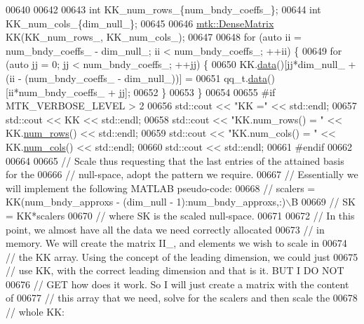 \begin{DoxyCode}
{{00640 
00642 
00643   \textcolor{keywordtype}{int} KK\_num\_rows\_\{num\_bndy\_coeffs\_\};
00644   \textcolor{keywordtype}{int} KK\_num\_cols\_\{dim\_null\_\};
00645 
00646   \hyperlink{classmtk_1_1DenseMatrix}{mtk::DenseMatrix} KK(KK\_num\_rows\_, KK\_num\_cols\_);
00647 
00648   \textcolor{keywordflow}{for} (\textcolor{keyword}{auto} ii = num\_bndy\_coeffs\_ - dim\_null\_; ii < num\_bndy\_coeffs\_; ++ii) \{
00649     \textcolor{keywordflow}{for} (\textcolor{keyword}{auto} jj = 0; jj < num\_bndy\_coeffs\_; ++jj) \{
00650       KK.\hyperlink{classmtk_1_1DenseMatrix_a0c33b8a9e01d157c61ddbdf807c25d84}{data}()[jj*dim\_null\_ + (ii - (num\_bndy\_coeffs\_ - dim\_null\_))] =
00651           qq\_t.\hyperlink{classmtk_1_1DenseMatrix_a0c33b8a9e01d157c61ddbdf807c25d84}{data}()[ii*num\_bndy\_coeffs\_ + jj];
00652     \}
00653   \}
00654 
00655 \textcolor{preprocessor}{  #if MTK\_VERBOSE\_LEVEL > 2}
00656   std::cout << \textcolor{stringliteral}{"KK ="} << std::endl;
00657   std::cout << KK << std::endl;
00658   std::cout << \textcolor{stringliteral}{"KK.num\_rows() = "} << KK.\hyperlink{classmtk_1_1DenseMatrix_a53f3afb3b6a8d21854458aaa9663cc74}{num\_rows}() << std::endl;
00659   std::cout << \textcolor{stringliteral}{"KK.num\_cols() = "} << KK.\hyperlink{classmtk_1_1DenseMatrix_a41747502d468c6728a4be31501b16e0e}{num\_cols}() << std::endl;
00660   std::cout << std::endl;
00661 \textcolor{preprocessor}{  #endif}
00662 
00664 
00665   \textcolor{comment}{// Scale thus requesting that the last entries of the attained basis for the}
00666   \textcolor{comment}{// null-space, adopt the pattern we require.}
00667   \textcolor{comment}{// Essentially we will implement the following MATLAB pseudo-code:}
00668   \textcolor{comment}{//  scalers = KK(num\_bndy\_approxs - (dim\_null - 1):num\_bndy\_approxs,:)\(\backslash\)B}
00669   \textcolor{comment}{//  SK = KK*scalers}
00670   \textcolor{comment}{// where SK is the scaled null-space.}
00671 
00672   \textcolor{comment}{// In this point, we almost have all the data we need correctly allocated}
00673   \textcolor{comment}{// in memory. We will create the matrix II\_, and elements we wish to scale in}
00674   \textcolor{comment}{// the KK array. Using the concept of the leading dimension, we could just}
00675   \textcolor{comment}{// use KK, with the correct leading dimension and that is it. BUT I DO NOT}
00676   \textcolor{comment}{// GET how does it work. So I will just create a matrix with the content of}
00677   \textcolor{comment}{// this array that we need, solve for the scalers and then scale the}
00678   \textcolor{comment}{// whole KK:}
}}
\end{DoxyCode}

